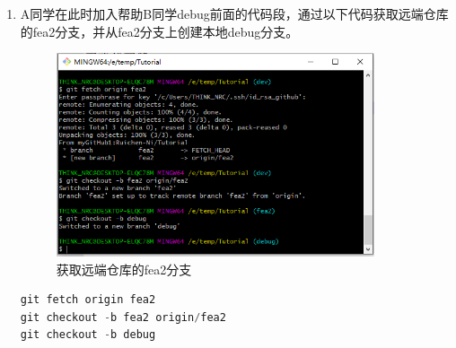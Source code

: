 \documentclass[a4paper,14pt]{article}
\begin{document}
\begin{enumerate}[1. ]
\item A同学在此时加入帮助B同学debug前面的代码段，通过以下代码获取远端仓库的fea2分支，并从fea2分支上创建本地debug分支。
\begin{figure}[h]
\centering
\includegraphics[height=6cm]{figure/stepB4}
\caption{获取远端仓库的fea2分支}
\end{figure}
{\color{red}
\begin{lstlisting}[language=C]
git fetch origin fea2
git checkout -b fea2 origin/fea2
git checkout -b debug
\end{lstlisting}
}


\end{enumerate}
\end{document}
